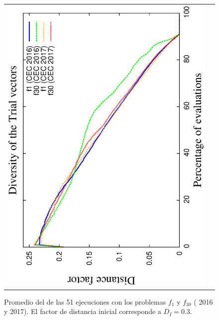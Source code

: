\begin{figure}[t]
\begin{tabular}{cc}
   \includegraphics[scale=0.23, angle=-90]{img/ED/Diversity_Trial.eps} 
\end{tabular}
\caption{ Promedio del \DCN{} de las 51 ejecuciones con los problemas $f_1$ y $f_{30}$ (\CEC{} 2016 y \CEC{} 2017). El factor de distancia inicial corresponde a $D_I=0.3$.}
\label{fig:diversity}
\end{figure}


